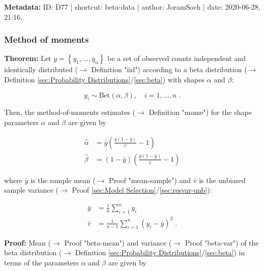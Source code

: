 \documentclass[a4paper,12pt,twoside]{book}
\begin{document}
\vspace{1em}
\textbf{Metadata:} ID: D77 | shortcut: beta-data | author: JoramSoch | date: 2020-06-28, 21:16.
\vspace{1em}



\subsubsection[\textbf{Method of moments}]{Method of moments} \label{sec:beta-mom}
\setcounter{equation}{0}

\textbf{Theorem:} Let $y = \left\lbrace y_1, \ldots, y_n \right\rbrace$ be a set of observed counts independent and identically distributed ($\rightarrow$ Definition "iid") according to a beta distribution ($\rightarrow$ Definition \ref{sec:Probability Distributions}/\ref{sec:beta}) with shapes $\alpha$ and $\beta$:

\begin{equation} \label{eq:beta-mom-Beta}
y_i \sim \mathrm{Bet}(\alpha,\beta), \quad i = 1, \ldots, n \; .
\end{equation}

Then, the method-of-moments estimates ($\rightarrow$ Definition "mome") for the shape parameters $\alpha$ and $\beta$ are given by

\begin{equation} \label{eq:beta-mom-Beta-MoM}
\begin{split}
\hat{\alpha} &= \bar{y} \left( \frac{\bar{y} (1-\bar{y})}{\bar{v}} - 1  \right) \\
\hat{\beta} &= (1-\bar{y}) \left( \frac{\bar{y} (1-\bar{y})}{\bar{v}} - 1  \right)
\end{split}
\end{equation}

where $\bar{y}$ is the sample mean ($\rightarrow$ Proof "mean-sample") and $\bar{v}$ is the unbiased sample variance ($\rightarrow$ Proof \ref{sec:Model Selection}/\ref{sec:resvar-unb}):

\begin{equation} \label{eq:beta-mom-y-mean-var}
\begin{split}
\bar{y} &= \frac{1}{n} \sum_{i=1}^n y_i \\
\bar{v} &= \frac{1}{n-1} \sum_{i=1}^n (y_i - \bar{y})^2 \; .
\end{split}
\end{equation}


\vspace{1em}
\textbf{Proof:} Mean ($\rightarrow$ Proof "beta-mean") and variance ($\rightarrow$ Proof "beta-var") of the beta distribution ($\rightarrow$ Definition \ref{sec:Probability Distributions}/\ref{sec:beta}) in terms of the parameters $\alpha$ and $\beta$ are given by
\end{document}
